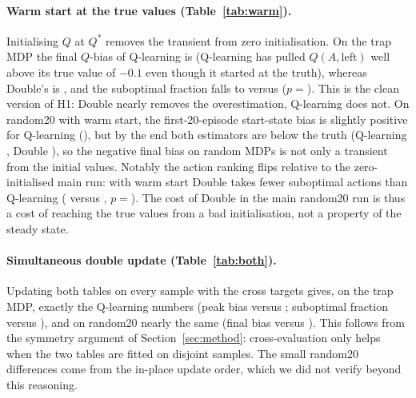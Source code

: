 \paragraph{Warm start at the true values (Table~\ref{tab:warm}).} Initialising $Q$ at $Q^\ast$ removes the transient from zero initialisation. On the trap MDP the final $Q$-bias of Q-learning is  (Q-learning has pulled $Q(A,\text{left})$ well above its true value of $-0.1$ even though it started at the truth), whereas Double's is , and the suboptimal fraction falls to  versus  ($p=$). This is the clean version of H1: Double nearly removes the overestimation, Q-learning does not. On random20 with warm start, the first-20-episode start-state bias is slightly positive for Q-learning (), but by the end both estimators are below the truth (Q-learning , Double ), so the negative final bias on random MDPs is not only a transient from the initial values. Notably the action ranking flips relative to the zero-initialised main run: with warm start Double takes fewer suboptimal actions than Q-learning ( versus , $p=$). The cost of Double in the main random20 run is thus a cost of reaching the true values from a bad initialisation, not a property of the steady state.

\begin{table}[t]\centering
\caption{Warm-start ablation (initial $Q=Q^\ast$), mean $\pm$ std over 5 seeds. Same metrics and conventions as Table~\ref{tab:main}.}\label{tab:warm}
\resizebox{0.9\textwidth}{!}{}
\end{table}

\paragraph{Simultaneous double update (Table~\ref{tab:both}).} Updating both tables on every sample with the cross targets gives, on the trap MDP, exactly the Q-learning numbers (peak bias  versus ; suboptimal fraction  versus ), and on random20 nearly the same (final bias  versus ). This follows from the symmetry argument of Section~\ref{sec:method}: cross-evaluation only helps when the two tables are fitted on disjoint samples. The small random20 differences come from the in-place update order, which we did not verify beyond this reasoning.

